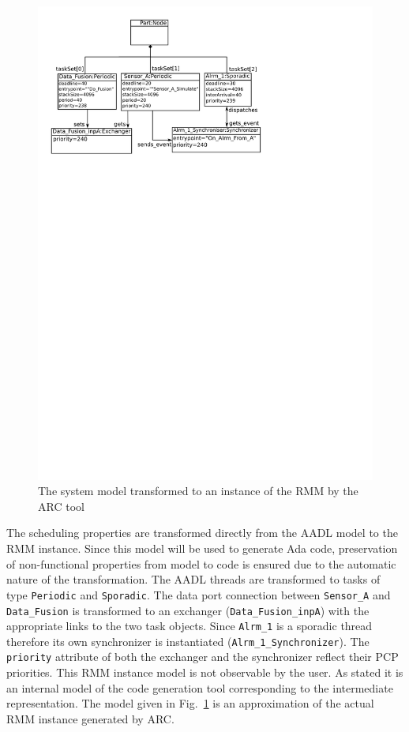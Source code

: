 \begin{figure}
\centering
\includegraphics[scale=0.70]{figs/rmm_inst}
\caption{The system model transformed to an instance of the RMM by the ARC tool}
\label{fig:rmm_inst}
\end{figure}

The scheduling properties are transformed directly from the AADL model
to the RMM instance. Since this model will be used to generate Ada
code, preservation of non-functional properties from model to code is
ensured due to the automatic nature of the transformation. The AADL
threads are transformed to tasks of type \texttt{Periodic} and
\texttt{Sporadic}. The data port connection between \texttt{Sensor\_A}
and \texttt{Data\_Fusion} is transformed to an exchanger
(\texttt{Data\_Fusion\_inpA}) with the appropriate links to the two
task objects. Since \texttt{Alrm\_1} is a sporadic thread therefore
its own synchronizer is instantiated
(\texttt{Alrm\_1\_Synchronizer}). The \texttt{priority} attribute of
both the exchanger and the synchronizer reflect their PCP
priorities. This RMM instance model is not observable by the user. As
stated it is an internal model of the code generation tool
corresponding to the intermediate representation. The model given in
Fig.~\ref{fig:rmm_inst} is an approximation of the actual RMM instance
generated by ARC.

